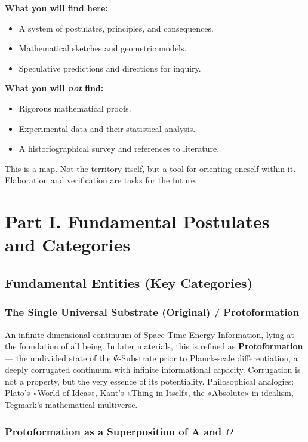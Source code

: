 \documentclass[a4paper,12pt]{article}
\begin{document}
	\textbf{What you will find here:}
	\begin{itemize}
		\item A system of postulates, principles, and consequences.
		\item Mathematical sketches and geometric models.
		\item Speculative predictions and directions for inquiry.
	\end{itemize}
	
	\textbf{What you will \emph{not} find:}
	\begin{itemize}
		\item Rigorous mathematical proofs.
		\item Experimental data and their statistical analysis.
		\item A historiographical survey and references to literature.
	\end{itemize}
	
	This is a map. Not the territory itself, but a tool for orienting oneself within it. Elaboration and verification are tasks for the future.
	
	\newpage
	\section{Part I. Fundamental Postulates and Categories}
	
	\subsection{Fundamental Entities (Key Categories)}
	
	\subsubsection{The Single Universal Substrate (Original) / Protoformation}
	
	An infinite-dimensional continuum of Space-Time-Energy-Information, lying at the foundation of all being. In later materials, this is refined as \textbf{Protoformation} — the undivided state of the $\Psi$-Substrate prior to Planck-scale differentiation, a deeply corrugated continuum with infinite informational capacity. Corrugation is not a property, but the very essence of its potentiality. Philosophical analogies: Plato's «World of Ideas», Kant's «Thing-in-Itself», the «Absolute» in idealism, Tegmark's mathematical multiverse.
	
	\subsubsection{Protoformation as a Superposition of A and $\Omega$}
	
\end{document}
